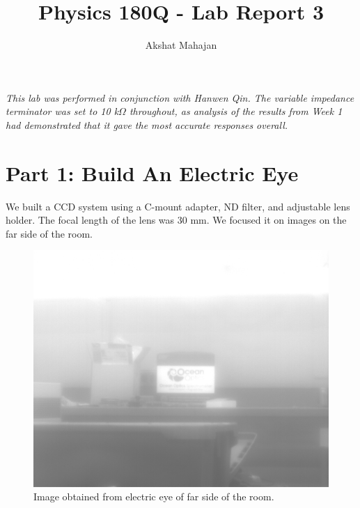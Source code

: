 \documentclass[10pt,a4paper]{article}
\author{Akshat Mahajan}
\title{Physics 180Q - Lab Report 3}
\begin{document}
\maketitle

\textsl{This lab was performed in conjunction with Hanwen Qin. The variable impedance terminator was set to 10 k$\Omega$ throughout, as analysis of the results from Week 1 had demonstrated that it gave the most accurate responses overall.}

\section*{Part 1: Build An Electric Eye}

We built a CCD system using a C-mount adapter, ND filter, and adjustable lens holder. The focal length of the lens was 30 mm. We focused it on images on the far side of the room.
\begin{figure}[h]
\includegraphics[width=\textwidth]{../Analysis/Part1-Run1.png}
\caption{Image obtained from electric eye of far side of the room.} 
\end{figure}
\end{document}

